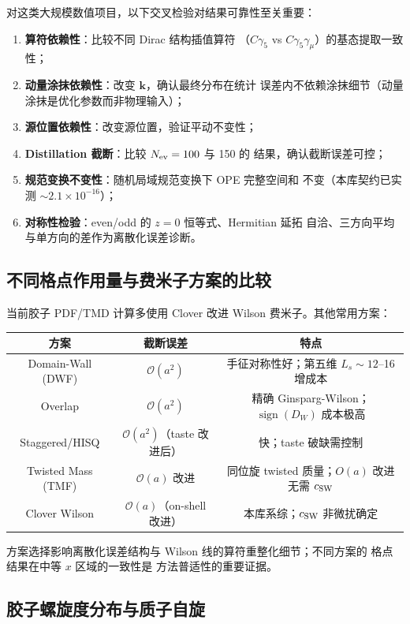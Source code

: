 \documentclass[11pt,a4paper]{ctexart}
\newcommand{\LaMET}{\text{LaMET}}
\newcommand{\order}[1]{\mathcal{O}(#1)}
\begin{document}
对这类大规模数值项目，以下交叉检验对结果可靠性至关重要：
\begin{enumerate}
  \item \textbf{算符依赖性}：比较不同 Dirac 结构插值算符
  （$C\gamma_5$ vs $C\gamma_5\gamma_\mu$）的基态提取一致性；
  \item \textbf{动量涂抹依赖性}：改变 $\mathbf k$，确认最终分布在统计
  误差内不依赖涂抹细节（动量涂抹是优化参数而非物理输入）；
  \item \textbf{源位置依赖性}：改变源位置，验证平动不变性；
  \item \textbf{Distillation 截断}：比较 $N_{\rm ev}=100$ 与 150 的
  结果，确认截断误差可控；
  \item \textbf{规范变换不变性}：随机局域规范变换下 OPE 完整空间和
  不变（本库契约已实测 $\sim2.1\times10^{-16}$）；
  \item \textbf{对称性检验}：even/odd 的 $z=0$ 恒等式、Hermitian 延拓
  自洽、三方向平均与单方向的差作为离散化误差诊断。
\end{enumerate}

\subsection{不同格点作用量与费米子方案的比较}

当前胶子 PDF/TMD 计算多使用 Clover 改进 Wilson 费米子。其他常用方案：
\begin{center}
\small
\begin{tabular}{c c c}
\toprule
\textbf{方案} & \textbf{截断误差} & \textbf{特点} \\
\midrule
Domain-Wall (DWF) & $\order{a^2}$ & 手征对称性好；第五维 $L_s\sim12$--16 增成本 \\
Overlap & $\order{a^2}$ & 精确 Ginsparg-Wilson；$\operatorname{sign}(D_W)$ 成本极高 \\
Staggered/HISQ & $\order{a^2}$（taste 改进后） & 快；taste 破缺需控制 \\
Twisted Mass (TMF) & $\order{a}$ 改进 & 同位旋 twisted 质量；$O(a)$ 改进无需 $c_{\rm SW}$ \\
Clover Wilson & $\order{a}$（on-shell 改进） & 本库系综；$c_{\rm SW}$ 非微扰确定 \\
\bottomrule
\end{tabular}
\end{center}
方案选择影响离散化误差结构与 Wilson 线的算符重整化细节；不同方案的
格点结果在中等 $x$ 区域的一致性是 \LaMET{} 方法普适性的重要证据。

\subsection{胶子螺旋度分布与质子自旋}
\end{document}
